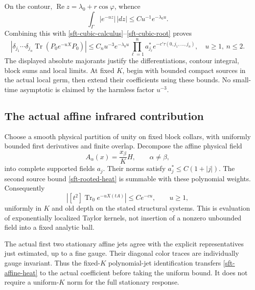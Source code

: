 On the contour,
\(\operatorname{Re}z=\lambda_0+r\cos\varphi\), whence
\[
 \int_\Gamma |e^{-uz}|\,|dz|
       \le C u^{-1}e^{-\lambda_0u}.
\]
Combining this with
\eqref{sft-cubic-calculus}--\eqref{sft-cubic-root} proves
\begin{equation}
 \left|\delta_{j_1}\cdots\delta_{j_n}
       \operatorname{Tr}(P_0e^{-uX}P_0)\right|
 \le C_nu^{-3}e^{-\lambda_0u}
       \prod_{\ell=1}^n a_{j_\ell}^*
       e^{-c'\tau(0,j_1,\ldots,j_n)},\quad u\ge1,\ n\le2.
 \label{sft-rooted-heat}
\end{equation}
The displayed absolute majorants justify the differentiations,
contour integral, block sums and local limits. At fixed \(K\), begin
with bounded compact sources in the actual local germ, then extend
their coefficients using these bounds. No small-time asymptotic is
claimed by the harmless factor \(u^{-3}\).

\subsection{The actual affine infrared contribution}
\label{sft-affine-section}

Choose a smooth physical partition of unity on fixed block collars,
with uniformly bounded first derivatives and finite overlap.
Decompose the affine physical field
\begin{equation}
 A_\alpha(x)=\frac{x_\beta}{K}H,\qquad \alpha\ne\beta,
 \label{sft-affine}
\end{equation}
into complete supported fields \(a_j\).
Their norms satisfy \(a_j^*\le C(1+|j|)\). The second source bound
\eqref{sft-rooted-heat} is summable with these polynomial weights.
Consequently
\begin{equation}
 \left|[t^2]\operatorname{Tr}_0 e^{-uX(tA)}\right|
       \le Ce^{-cu},\qquad u\ge1,
 \label{sft-affine-heat}
\end{equation}
uniformly in \(K\) and old depth on the stated structural systems.
This is evaluation of exponentially localized Taylor kernels,
not insertion of a nonzero unbounded field into a fixed analytic ball.

The actual first two stationary affine jets agree with the explicit
representatives just estimated, up to a fine gauge. Their diagonal
color traces are individually gauge invariant. Thus the fixed-\(K\)
polynomial-jet identification transfers
\eqref{sft-affine-heat} to the actual coefficient before taking the
uniform bound. It does not require a uniform-\(K\) norm for the
full stationary response.

